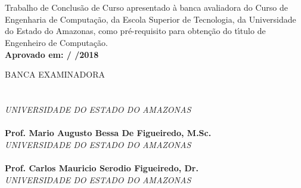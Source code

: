 
\begin{center}
\bf \MakeUppercase{\nome}\\[1.5 cm]
\end{center}

\begin{center}
\bf \MakeUppercase{\titulo}\\[1.5cm]
\end{center}

\hspace*{8cm}
\begin{minipage}{8cm}

Trabalho de Conclus\~{a}o de Curso apresentado \`{a}
banca avaliadora do Curso de Engenharia de Computa\c{c}\~{a}o,
da Escola Superior de Tecnologia, da Universidade do Estado do Amazonas,
como pr\'e-requisito para obten\c{c}\~{a}o do t\'{\i}tulo de
Engenheiro de Computa\c{c}\~{a}o.\\

\large \bf Aprovado em:      /      /2018
\end{minipage}

BANCA EXAMINADORA\\[12 pt]

\noindent \hrulefill \hspace*{6cm} \\
\noindent \textbf{\orientador}\\
\textit{UNIVERSIDADE DO ESTADO DO AMAZONAS}\\[0.5cm]

\noindent \hrulefill \hspace*{6cm} \\
\noindent \textbf{Prof.  Mario Augusto Bessa De Figueiredo, M.Sc.}\\
\textit{UNIVERSIDADE DO ESTADO DO AMAZONAS}\\[0.5cm]

\noindent \hrulefill \hspace*{6cm} \\
\noindent \textbf{Prof. Carlos Mauricio Serodio Figueiredo, Dr.}\\
\textit{UNIVERSIDADE DO ESTADO DO AMAZONAS}\\
